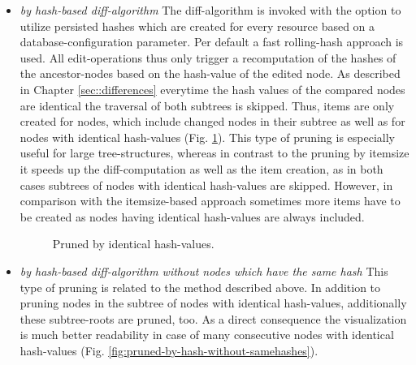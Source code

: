 \begin{itemize}
\item \emph{by hash-based diff-algorithm} The diff-algorithm is invoked with the option to utilize persisted hashes which are created for every resource based on a database-configuration parameter. Per default a fast rolling-hash approach is used. All edit-operations thus only trigger a recomputation of the hashes of the ancestor-nodes based on the hash-value of the edited node. As described in Chapter \ref{sec::differences} everytime the hash values of the compared nodes are identical the traversal of both subtrees is skipped. Thus, items are only created for nodes, which include changed nodes in their subtree as well as for nodes with identical hash-values (Fig. \ref{fig:pruned-by-hash}). This type of pruning is especially useful for large tree-structures, whereas in contrast to the pruning by itemsize it speeds up the diff-computation as well as the item creation, as in both cases subtrees of nodes with identical hash-values are skipped. However, in comparison with the itemsize-based approach sometimes more items have to be created as nodes having identical hash-values are always included.

\begin{figure}[tb]
\caption{\label{fig:pruned-by-hash} Pruned by identical hash-values.}
\end{figure}

\item \emph{by hash-based diff-algorithm without nodes which have the same hash} This type of pruning is related to the method described above. In addition to pruning nodes in the subtree of nodes with identical hash-values, additionally these subtree-roots are pruned, too. As a direct consequence the visualization is much better readability in case of many consecutive nodes with identical hash-values (Fig. \ref{fig:pruned-by-hash-without-samehashes}).


\end{itemize}
